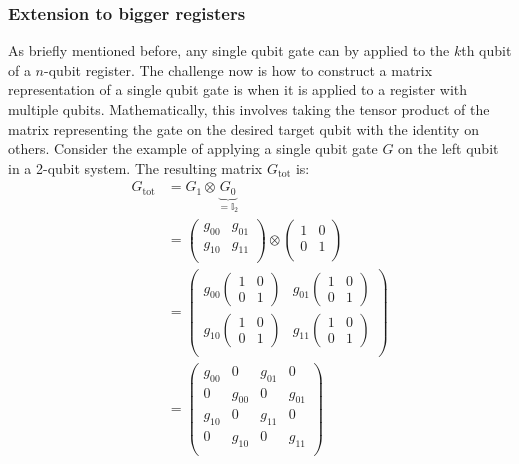 \documentclass[bibliography=totocnumbered, 10pt]{article}
\theoremstyle{NoticeStyle}
\begin{document}
\subsubsection{Extension to bigger registers}\label{sec:Extension to bigger registers}
As briefly mentioned before, any single qubit gate can by applied to the $k$th qubit of a $n$-qubit register. The challenge now is how to construct a matrix representation of a single qubit gate is when it is applied to a register with multiple qubits. Mathematically, this involves taking the tensor product of the matrix representing the gate on the desired target qubit with the identity on others. Consider the example of applying a single qubit gate $G$ on the left qubit in a 2-qubit system. The resulting matrix $G_\text{tot}$ is:
%
\begin{align}
	G_\text{tot} 
	&= G_1 \otimes \underbrace{G_0}_{=\mathbb{I}_2}\\
	&=
	\begin{pmatrix}
		g_{00} & g_{01}\\
		g_{10} & g_{11}\\
	\end{pmatrix}
	\otimes
	\begin{pmatrix}
		1 & 0\\
		0 & 1\\
	\end{pmatrix}\\
	&=
	\begin{pmatrix}
		g_{00} \left(\begin{smallmatrix}1& 0\\ 0& 1\end{smallmatrix}\right) & g_{01} \left(\begin{smallmatrix}1& 0\\ 0& 1\end{smallmatrix}\right)\\
		g_{10} \left(\begin{smallmatrix}1& 0\\ 0& 1\end{smallmatrix}\right) & g_{11} \left(\begin{smallmatrix}1& 0\\ 0& 1\end{smallmatrix}\right)\\
	\end{pmatrix}
	\\
	&=
	\begin{pmatrix}
		g_{00} & 0 & g_{01} & 0\\
		0 & g_{00} & 0 & g_{01}\\
		g_{10} & 0 & g_{11} & 0\\
		0 & g_{10} & 0 & g_{11}\\
	\end{pmatrix}
\end{align}
\end{document}
